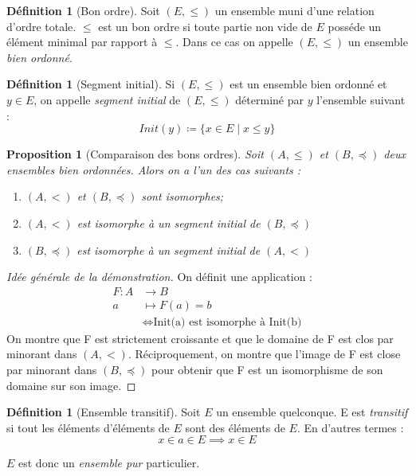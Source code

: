 \documentclass{article}
\theoremstyle{definition}
\newtheorem{definition}[subsubsection]{Définition}
\theoremstyle{plain}
\newtheorem{proposition}[subsubsection]{Proposition}
\theoremstyle{plain}
\theoremstyle{plain}
\theoremstyle{plain}
\theoremstyle{plain}
\begin{document}
\begin{definition}[Bon ordre]
	Soit \( (E,\le) \) un ensemble muni d'une relation d'ordre totale. \( \le \) est un bon ordre si toute partie non vide de \( E \) posséde un élément minimal par rapport à \( \le \). Dans ce cas on appelle \( (E,\le) \) un ensemble \textit{bien ordonné}.	
\end{definition}

\begin{definition}[Segment initial]
	Si \( (E,\le) \) est un ensemble bien ordonné et \( y \in E\), on appelle \textit{segment initial} de \( (E,\le) \) déterminé par \( y \) l'ensemble suivant :
	\begin{equation*}
		Init(y) \coloneqq \{ x \in E \mid x \le y \}
	\end{equation*}
\end{definition}

\begin{proposition}[Comparaison des bons ordres]
	Soit \( (A,\le) \) et \( (B,\preceq) \) deux ensembles bien ordonnées. Alors on a l'un des cas suivants :
	\begin{enumerate}[label = (\roman*)]
		\item \( (A,<) \) et \( (B,\preceq) \) sont isomorphes;
		\item \( (A,<) \) est isomorphe à un segment initial de \( (B,\preceq) \)
		\item \( (B,\preceq) \) est isomorphe à un segment initial de \( (A,<) \)
	\end{enumerate}
\end{proposition}
\begin{proof}[Idée générale de la démonstration]
	On définit une application :
	\begin{align*}
		F : A &\rightarrow B \\
		a &\mapsto F(a) = b \\
			       &\Leftrightarrow \text{Init(a) est isomorphe à Init(b)}
	\end{align*}
	On montre que F est strictement croissante et que le domaine de F est clos par minorant dans \( (A,<) \). Réciproquement, on montre que l'image de F est close par minorant dans \( (B,\preceq) \) pour obtenir que F est un isomorphisme de son domaine sur son image.
\end{proof}
\begin{definition}[Ensemble transitif]
	Soit \( E \) un ensemble quelconque. E est \textit{transitif} si tout les éléments d'éléments de \( E \) sont des éléments de \( E \). En d'autres termes :
	\begin{equation}\label{eq:Tr} \tag{Tr}
		x \in a \in E \implies x \in E 
	\end{equation}

	\( E \) est donc un \textit{ensemble pur} particulier.  \cite{nlab:pure_set} \cite{nlab:transitive_set} 
\end{definition}
\end{document}

